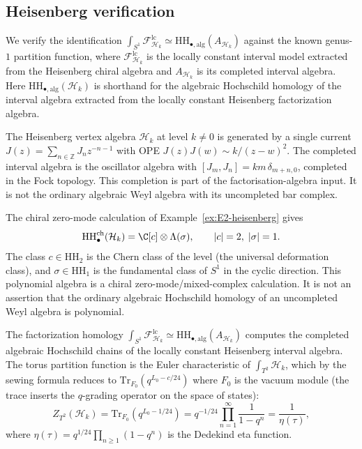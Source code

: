 \subsection{Heisenberg verification}

\begin{example}
\label{ex:heisenberg-HH-chains}
We verify the identification
$\int_{S^1} \mathcal F_{\mathcal{H}_k}^{\mathrm{lc}}
\simeq \mathrm{HH}_{\bullet,\mathrm{alg}}(A_{\mathcal{H}_k})$
against the known genus-$1$ partition function, where
$\mathcal F_{\mathcal{H}_k}^{\mathrm{lc}}$ is the locally constant
interval model extracted from the Heisenberg chiral algebra and
$A_{\mathcal{H}_k}$ is its completed interval algebra.
Here $\mathrm{HH}_{\bullet,\mathrm{alg}}(\mathcal{H}_k)$ is
shorthand for the algebraic Hochschild homology of the interval
algebra extracted from the locally constant Heisenberg
factorization algebra.

The Heisenberg vertex algebra $\mathcal{H}_k$ at level $k \neq 0$
is generated by a single current
$J(z)=\sum_{n\in\mathbb Z}J_nz^{-n-1}$ with OPE
$J(z)J(w)\sim k/(z-w)^2$. The completed interval algebra is the
oscillator algebra with
$[J_m,J_n]=km\,\delta_{m+n,0}$, completed in the Fock topology.
This completion is part of the factorisation-algebra input. It is not
the ordinary algebraic Weyl algebra with its uncompleted bar complex.

The chiral zero-mode calculation of Example~\ref{ex:E2-heisenberg}
gives
\[
\mathrm{HH}_\bullet^{\mathrm{ch}}(\mathcal{H}_k)
= \C[c] \otimes \Lambda(\sigma),
\qquad |c| = 2,\; |\sigma| = 1.
\]
The class $c \in \mathrm{HH}_2$ is the Chern class of the level
(the universal deformation class), and $\sigma \in \mathrm{HH}_1$
is the fundamental class of $S^1$ in the cyclic direction.
This polynomial algebra is a chiral zero-mode/mixed-complex
calculation. It is not an assertion that the ordinary algebraic
Hochschild homology of an uncompleted Weyl algebra is polynomial.

The factorization homology
$\int_{S^1}\mathcal F_{\mathcal{H}_k}^{\mathrm{lc}}
\simeq \mathrm{HH}_{\bullet,\mathrm{alg}}(A_{\mathcal{H}_k})$
computes the completed algebraic Hochschild chains of the locally
constant Heisenberg interval algebra. The torus partition function is the Euler
characteristic of $\int_{T^2}\mathcal{H}_k$,
which by the sewing formula reduces to
$\mathrm{Tr}_{F_0}(q^{L_0 - c/24})$ where $F_0$ is the
vacuum module (the trace inserts the $q$-grading operator
on the space of states):
\[
Z_{T^2}(\mathcal{H}_k)
= \mathrm{Tr}_{F_0}(q^{L_0 - 1/24})
= q^{-1/24} \prod_{n=1}^{\infty} \frac{1}{1 - q^n}
= \frac{1}{\eta(\tau)},
\]
where $\eta(\tau) = q^{1/24} \prod_{n \geq 1}(1-q^n)$ is the
Dedekind eta function.


\end{example}
